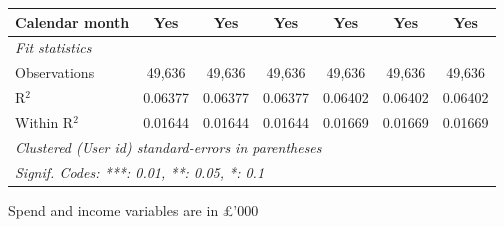 \begin{table}[htbp]
\begin{threeparttable}[b]
\begin{tabular}{lcccccc}
         Calendar month      & Yes            & Yes            & Yes            & Yes            & Yes            & Yes\\  
         \midrule
         \emph{Fit statistics}\\
         Observations        & 49,636         & 49,636         & 49,636         & 49,636         & 49,636         & 49,636\\  
         R$^2$               & 0.06377        & 0.06377        & 0.06377        & 0.06402        & 0.06402        & 0.06402\\  
         Within R$^2$        & 0.01644        & 0.01644        & 0.01644        & 0.01669        & 0.01669        & 0.01669\\  
         \midrule \midrule
         \multicolumn{7}{l}{\emph{Clustered (User id) standard-errors in parentheses}}\\
         \multicolumn{7}{l}{\emph{Signif. Codes: ***: 0.01, **: 0.05, *: 0.1}}\\
      \end{tabular}
      
      \begin{tablenotes}\footnotesize
         \item Spend and income variables are in £'000
      \end{tablenotes}
   \end{threeparttable}
\end{table}


